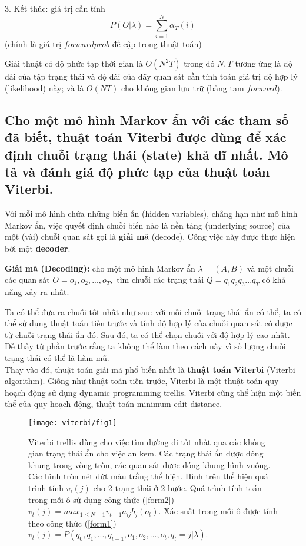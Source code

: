 3. Kết thúc: giá trị cần tính \[P(O|\lambda) = \displaystyle\sum_{i=1}^{N}\alpha_{T}(i)\] (chính là giá trị \(forwardprob\) đề cập trong thuật toán)

Giải thuật có độ phức tạp thời gian là \(O(N^2T)\) trong đó \(N,T\) tương ứng là độ dài của tập trạng thái và độ dài của dãy quan sát cần tính toán giá trị độ hợp lý (likelihood) này; và là \(O(NT)\) cho không gian lưu trữ (bảng tạm $forward$).

\subsection{Cho một mô hình Markov ẩn với các tham số đã biết, thuật toán Viterbi được dùng để xác định chuỗi trạng thái (state) khả dĩ nhất. Mô tả và đánh giá độ phức tạp của thuật toán Viterbi.}
Với mỗi mô hình chứa những biến ẩn (hidden variables), chẳng hạn như mô hình Markov ẩn, việc quyết định chuỗi biến nào là nền tảng (underlying source) của một (vài) chuỗi quan sát gọi là \textbf{giải mã} (decode). Công việc này được thực hiện bởi một \textbf{decoder}.\\
\begin{mybox}
\textbf{Giải mã (Decoding):} cho một mô hình Markov ẩn $\lambda = \left( {A, B} \right)$ và một chuỗi các quan sát $O = o_1, o_2, ..., o_T,$ tìm chuỗi các trạng thái $Q = {q_1}{q_2}{q_3}...{q_T}$ có khả năng xảy ra nhất.
\end{mybox}
Ta có thể đưa ra chuỗi tốt nhất như sau: với mỗi chuỗi trạng thái ẩn có thể, ta có thể sử dụng thuật toán tiến trước và tính độ hợp lý của chuỗi quan sát có được từ chuỗi trạng thái ẩn đó. Sau đó, ta có thể chọn chuỗi với độ hợp lý cao nhất. Dễ thấy từ phần trước rằng ta không thể làm theo cách này vì số lượng chuỗi trạng thái có thể là hàm mũ.\\
Thay vào đó, thuật toán giải mã phổ biến nhất là \textbf{thuật toán Viterbi} (Viterbi algorithm). Giống như thuật toán tiến trước, Viterbi là một thuật toán quy hoạch động sử dụng dynamic programming trellis. Viterbi cũng thể hiện một biến thể của quy hoạch động, thuật toán minimum edit distance.
\begin{figure}[H]
\begin{center}
\texttt{[image: viterbi/fig1]}
\end{center}
\caption{Viterbi trellis dùng cho việc tìm đường đi tốt nhất qua các không gian trạng thái ẩn cho việc ăn kem. Các trạng thái ẩn được đóng khung trong vòng tròn, các quan sát được đóng khung hình vuông. Các hình tròn nét đứt màu trắng thể hiện. Hình trên thể hiện quá trình tính $v_i \left( j \right)$ cho 2 trạng thái ở 2 bước. Quá trình tính toán trong mỗi ô sử dụng công thức (\ref{form2}) $v_t \left( j \right) = max_{1 \leqslant N - 1}v_{t - 1}a_{ij}b_j \left( {o_t} \right)$. Xác suất trong mỗi ô được tính theo công thức (\ref{form1}) $v_t \left( j \right) = P \left( {q_0, q_1, ..., q_{t - 1}, o_1, o_2, ..., o_t, q_t = \left. j \right|\lambda} \right).$ \label{viterbi_fig1}}
\end{figure}
